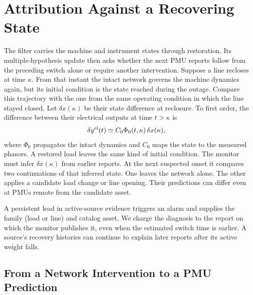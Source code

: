 \section{Attribution Against a Recovering State}
\label{sec:narrative-method}

The filter carries the machine and instrument states through
restoration. Its multiple-hypothesis update then asks whether the
next PMU reports follow from the preceding switch alone or require
another intervention.
Suppose a line recloses at time $\kappa$. From that instant the intact
network governs the machine dynamics again, but its initial condition is
the state reached during the outage. Compare this trajectory with the one
from the same operating condition in which the line stayed closed. Let
$\delta x(\kappa)$ be their state difference at reclosure. To first order,
the difference between their electrical outputs at time $t>\kappa$ is
\begin{equation}
 \delta y^{\rm el}(t)\simeq C_0\Phi_0(t,\kappa)\,\delta x(\kappa),
 \label{eq:recovery-response}
\end{equation}
where $\Phi_0$ propagates the intact dynamics and $C_0$ maps the state
to the measured phasors. A restored load leaves the same kind of initial
condition. The monitor must infer $\delta x(\kappa)$ from earlier reports.
At the next suspected onset it compares two continuations of that inferred
state. One leaves the network alone. The other applies a candidate load
change or line opening. Their predictions can differ even at PMUs remote
from the candidate asset.

A persistent lead in active-source evidence triggers an alarm and supplies
the family (load or line) and catalog asset. We charge the diagnosis to
the report on which the monitor publishes it, even when the estimated
switch time is earlier. A source's recovery histories can continue to
explain later reports after its active weight falls.

\subsection{From a Network Intervention to a PMU Prediction}

